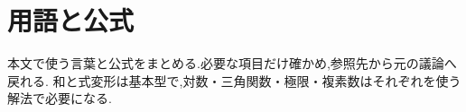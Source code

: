 \chapter{用語と公式}\label{章：用語と計算の参照}\label{章：前提知識と計算の基本}\label{章：計算の基本}
\begin{bookcolumns}
本文で使う言葉と公式をまとめる.必要な項目だけ確かめ,参照先から元の議論へ戻れる.
和と式変形は基本型で,対数・三角関数・極限・複素数はそれぞれを使う解法で必要になる.













\end{bookcolumns}
